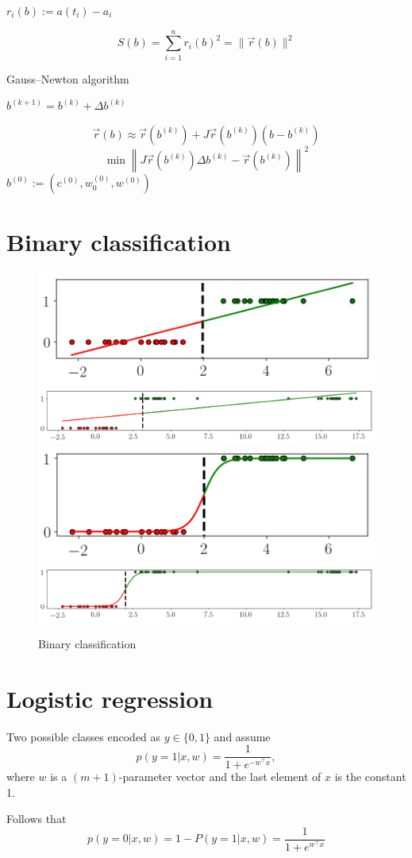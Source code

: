 \documentclass[notitlepage,oneside]{book}
\begin{document}
$r_i(b) := a(t_i) - a_i$

$$
S(b) = \sum\limits_{i=1}^n r_i(b)^2 = \|\vec{r}(b)\|^2
$$

Gauss–Newton algorithm

$b^{(k+1)} = b^{(k)} + \Delta b^{(k)}$

$$
\vec{r}(b) \approx \vec{r}\left(b^{(k)}\right) + J\vec{r}\left(b^{(k)}\right) \left(b - b^{(k)}\right)
$$
$$
\min \left\| J\vec{r}\left(b^{(k)}\right) \Delta b^{(k)} - \vec{r}\left(b^{(k)}\right) \right\|^2 
$$
$b^{(0)} := \left(c^{(0)}, w_0^{(0)}, w^{(0)}\right)$


\section{Binary classification}

\begin{figure}[htb]
    \centering
    \includegraphics[width=.305\linewidth]{linear-1d-a.png}
    \includegraphics[width=.64\linewidth]{linear-1d-b.png}
    \includegraphics[width=.305\linewidth]{logistic-1d-a.png}
    \includegraphics[width=.64\linewidth]{logistic-1d-b.png}
    \caption{Binary classification}
    \label{fig:logistic-vs-linear}
\end{figure}



\section{Logistic regression}
Two possible classes encoded as $y \in \{0,1\}$ and assume
$$
p(y=1|x,w) = \frac{1}{1+e^{-w^\top x}},
$$
where $w$ is a $(m+1)$-parameter vector and the last element of $x$ is the constant 1.

Follows that
$$
p(y=0|x,w) = 1-P(y=1|x,w) = \frac{1}{1+e^{w^\top x}}
$$
\end{document}
